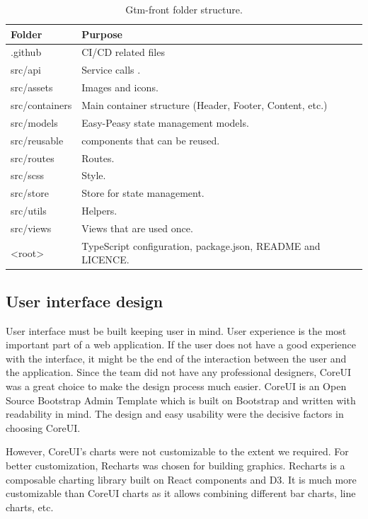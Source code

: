\begin{table}[h]
    \centering
    \begin{tabular}{ | p{3cm} | p{10cm} |}
        \hline
        \textbf{Folder} & \textbf{Purpose}\\
        \hline
        .github & CI/CD related files\\
        \hline
        src/api & Service calls .\\
        \hline
        src/assets & Images and icons. \\
        \hline
        src/containers & Main container structure (Header, Footer, Content, etc.)\\
        \hline
        src/models & Easy-Peasy state management models.\\
        \hline
        src/reusable & components that can be reused.\\
        \hline
        src/routes & Routes.\\
        \hline
        src/scss & Style.\\
        \hline
        src/store & Store for state management.\\
        \hline
        src/utils & Helpers.\\
        \hline
        src/views & Views that are used once.\\
        \hline
        <root> & TypeScript configuration, package.json, README and LICENCE.\\
        \hline
    \end{tabular}
    \caption{Gtm-front folder structure.}
    \label{tab:gtm-front-folder-structure}
\end{table}

\subsection{User interface design}\label{subsec:user-interface-design}
User interface must be built keeping user in mind.
User experience is the most important part of a web application.
If the user does not have a good experience with the interface, it might be the end of the interaction between the user and the application.
Since the team did not have any professional designers, CoreUI was a great choice to make the design process much easier.
CoreUI is an Open Source Bootstrap Admin Template which is built on Bootstrap and written with readability in mind.
The design and easy usability were the decisive factors in choosing CoreUI.

However, CoreUI's charts were not customizable to the extent we required.
For better customization, Recharts was chosen for building graphics.
Recharts is a composable charting library built on React components and D3.
It is much more customizable than CoreUI charts as it allows combining different bar charts, line charts, etc.
\cite{recharts-readme}

